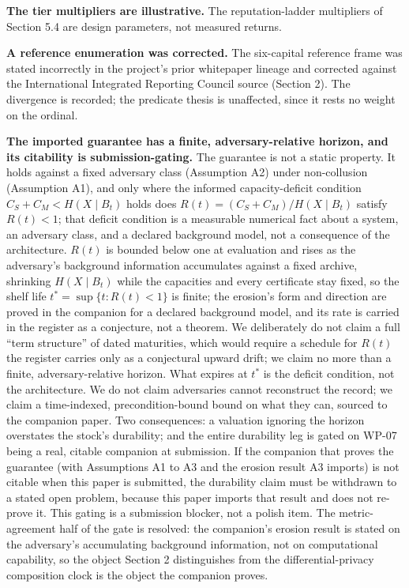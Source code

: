 \documentclass[
  11pt,
]{article}
\begin{document}
\textbf{The tier multipliers are illustrative.} The reputation-ladder
multipliers of Section 5.4 are design parameters, not measured returns.

\textbf{A reference enumeration was corrected.} The six-capital
reference frame was stated incorrectly in the project's prior whitepaper
lineage and corrected against the International Integrated Reporting
Council source (Section 2). The divergence is recorded; the predicate
thesis is unaffected, since it rests no weight on the ordinal.

\textbf{The imported guarantee has a finite, adversary-relative horizon,
and its citability is submission-gating.} The guarantee is not a static
property. It holds against a fixed adversary class (Assumption A2) under
non-collusion (Assumption A1), and only where the informed
capacity-deficit condition \(C_S + C_M < H(X \mid B_t)\) holds does
\(R(t) = (C_S + C_M)/H(X \mid B_t)\) satisfy \(R(t) < 1\); that deficit
condition is a measurable numerical fact about a system, an adversary
class, and a declared background model, not a consequence of the
architecture. \(R(t)\) is bounded below one at evaluation and rises as
the adversary's background information accumulates against a fixed
archive, shrinking \(H(X \mid B_t)\) while the capacities and every
certificate stay fixed, so the shelf life
\(t^{*} = \sup\{t : R(t) < 1\}\) is finite; the erosion's form and
direction are proved in the companion for a declared background model,
and its rate is carried in the register as a conjecture, not a theorem.
We deliberately do not claim a full ``term structure'' of dated
maturities, which would require a schedule for \(R(t)\) the register
carries only as a conjectural upward drift; we claim no more than a
finite, adversary-relative horizon. What expires at \(t^{*}\) is the
deficit condition, not the architecture. We do not claim adversaries
cannot reconstruct the record; we claim a time-indexed,
precondition-bound bound on what they can, sourced to the companion
paper. Two consequences: a valuation ignoring the horizon overstates the
stock's durability; and the entire durability leg is gated on WP-07
being a real, citable companion at submission. If the companion that
proves the guarantee (with Assumptions A1 to A3 and the erosion result
A3 imports) is not citable when this paper is submitted, the durability
claim must be withdrawn to a stated open problem, because this paper
imports that result and does not re-prove it. This gating is a
submission blocker, not a polish item. The metric-agreement half of the
gate is resolved: the companion's erosion result is stated on the
adversary's accumulating background information, not on computational
capability, so the object Section 2 distinguishes from the
differential-privacy composition clock is the object the companion
proves.
\end{document}
